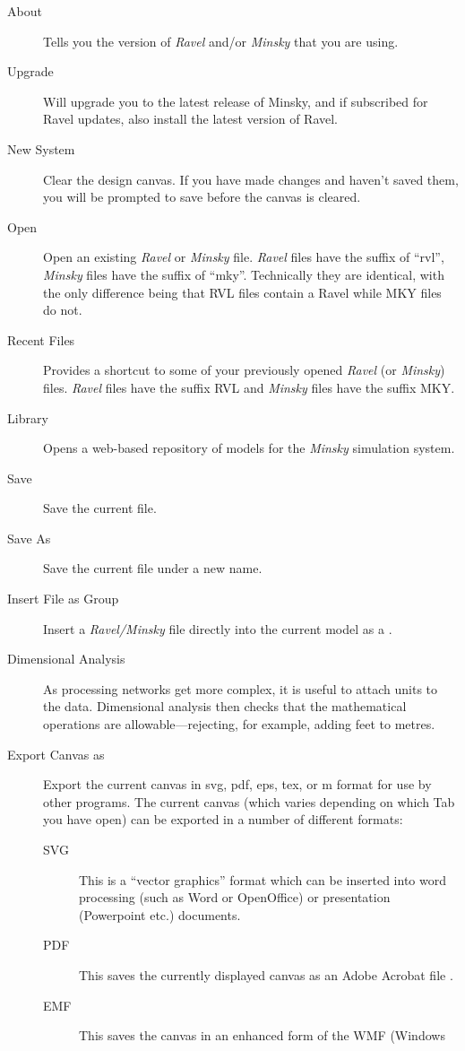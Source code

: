 \label{File}
\begin{description}
\item [{About}] Tells you the version of \emph{Ravel} and/or \emph{Minsky}
  that you are using.
\item[Upgrade] Will upgrade you to the latest release of Minsky, and
  if subscribed for Ravel updates, also install the latest version of Ravel.
\item [{New System}] Clear the design canvas. If you have made changes
and haven't saved them, you will be prompted to save before the canvas
is cleared.
\item [{Open}] Open an existing \emph{Ravel} or \emph{Minsky} file. \emph{Ravel}
files have the suffix of ``rvl'', \emph{Minsky} files have the suffix
of ``mky''. Technically they are identical, with the only difference
being that RVL files contain a Ravel while MKY files do not.
\item [{Recent Files}] \label{recentfiles} Provides a shortcut to some
of your previously opened \emph{Ravel} (or \emph{Minsky}) files. \emph{Ravel}
files have the suffix RVL and \emph{Minsky }files have the suffix
MKY.
\item [{Library}] Opens a web-based repository of models for the \emph{Minsky}
simulation system.
\item [{Save}] Save the current file.
\item [{Save As}] Save the current file under a new name.
\item [{Insert File as Group}] Insert a \emph{Ravel/Minsky} file directly
into the current model as a .
\item [{Dimensional Analysis}] As processing networks
get more complex, it is useful to attach units to the
data. Dimensional analysis then checks that the mathematical
operations are allowable---rejecting, for example, adding feet to
metres.
\item [{Export Canvas as}] Export the current canvas in svg, pdf, eps,
tex, or m format for use by other programs. The current canvas (which
varies depending on which Tab you have open) can be exported in a
number of different formats:
\begin{description}
\item[SVG] This is a ``vector graphics'' format which can be inserted into
word processing (such as Word or OpenOffice) or presentation (Powerpoint
etc.) documents. 
\item[PDF] This saves the currently displayed canvas as an Adobe Acrobat
file .
\item[EMF] This saves the canvas in an enhanced form of the WMF (Windows

\end{description}
\end{description}
